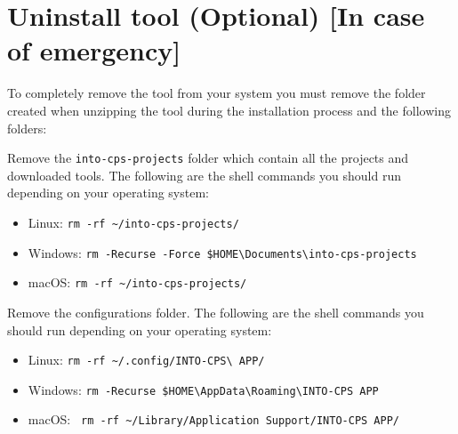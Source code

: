 \documentclass[11pt,a4paper]{../tutorial}
\begin{document}
\newpage
\section{Uninstall tool (Optional) [In case of emergency]}

To completely remove the tool from your system you must remove the folder
created when unzipping the tool during the installation process and the
following folders: 

\begin{instructions}
\item Remove the \verb'into-cps-projects' folder which contain all the projects and downloaded tools. The following are the shell commands you should run depending on your operating system:  
	\begin{itemize}
		\item Linux: \verb'rm -rf ~/into-cps-projects/'
		\item Windows: \verb'rm -Recurse -Force $HOME\Documents\into-cps-projects'	
		\item macOS: \verb'rm -rf ~/into-cps-projects/'
	\end{itemize}

\item Remove the configurations folder. The following are the shell commands you should run depending on your operating system:  

	\begin{itemize}
		\item Linux: \verb'rm -rf ~/.config/INTO-CPS\ APP/'
		\item Windows: \verb'rm -Recurse $HOME\AppData\Roaming\INTO-CPS APP'
		\item macOS: \verb' rm -rf ~/Library/Application Support/INTO-CPS APP/'
	\end{itemize}
\end{instructions}
\end{document}
